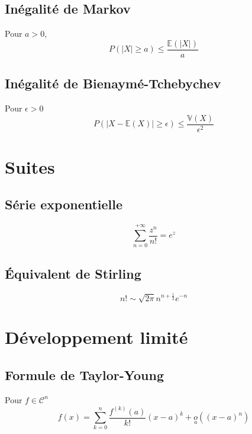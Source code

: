 \documentclass[]{article}
\begin{document}
\subsection*{Inégalité de Markov}
Pour $a > 0$,
\[ P(|X| \geq a) \leq \frac{\mathbb{E}(|X|)}{a} \]

\subsection*{Inégalité de Bienaymé-Tchebychev}
Pour $\epsilon > 0$
\[ P( | X - \mathbb{E}(X) | \geq \epsilon ) \leq \frac{\mathbb{V}(X)}{\epsilon^2} \]

\section{Suites}

\subsection*{Série exponentielle}
\[ \sum_{n=0}^{+\infty} \frac{z^n}{n!} = e^z \]

\subsection*{Équivalent de Stirling}
\[ n! \sim \sqrt{2 \pi} n^{n+\frac{1}{2}}e^{-n} \]

\section{Développement limité}

\subsection*{Formule de Taylor-Young}
Pour $f \in \mathcal{C}^{n}$
\[ f(x) = \sum_{k=0}^{n} \frac{f^{(k)}(a)}{k!} (x-a)^k + \underset{a}{o} ((x-a)^n) \]
\end{document}
